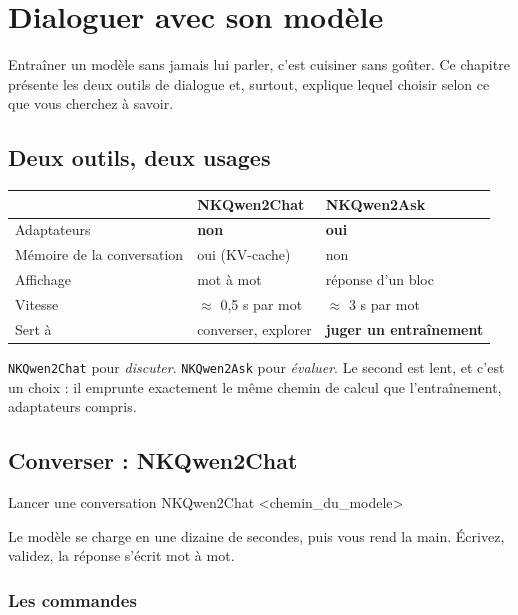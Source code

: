 \chapter{Dialoguer avec son modèle}

Entraîner un modèle sans jamais lui parler, c'est cuisiner sans goûter. Ce
chapitre présente les deux outils de dialogue et, surtout, explique lequel
choisir selon ce que vous cherchez à savoir.

\section{Deux outils, deux usages}

\begin{center}
\begin{tabular}{p{3.4cm}p{5.0cm}p{5.2cm}}
\toprule
 & \textbf{NKQwen2Chat} & \textbf{NKQwen2Ask} \\
\midrule
Adaptateurs & \textbf{non} & \textbf{oui} \\
Mémoire de la conversation & oui (KV-cache) & non \\
Affichage & mot à mot & réponse d'un bloc \\
Vitesse & $\approx$ 0,5 s par mot & $\approx$ 3 s par mot \\
Sert à & converser, explorer & \textbf{juger un entraînement} \\
\bottomrule
\end{tabular}
\end{center}

\begin{nkretenir}
\texttt{NKQwen2Chat} pour \emph{discuter}. \texttt{NKQwen2Ask} pour
\emph{évaluer}. Le second est lent, et c'est un choix : il emprunte exactement le
même chemin de calcul que l'entraînement, adaptateurs compris.
\end{nkretenir}

\section{Converser : NKQwen2Chat}

\begin{nkcode}[]{Lancer une conversation}
NKQwen2Chat <chemin_du_modele>
\end{nkcode}

Le modèle se charge en une dizaine de secondes, puis vous rend la main. Écrivez,
validez, la réponse s'écrit mot à mot.

\subsection{Les commandes}

